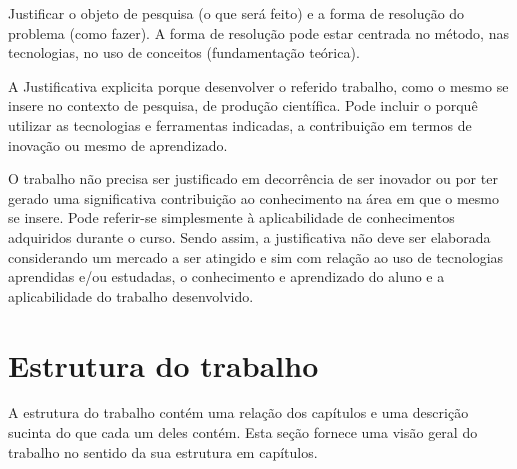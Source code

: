 Justificar o objeto de pesquisa (o que será feito) e a forma de resolução do problema (como fazer). A forma de resolução pode estar centrada no método, nas tecnologias, no uso de conceitos (fundamentação teórica).

A Justificativa explicita porque desenvolver o referido trabalho, como o mesmo se insere no contexto de pesquisa, de produção científica. Pode incluir o porquê utilizar as tecnologias e ferramentas indicadas, a contribuição em termos de inovação ou mesmo de aprendizado.

O trabalho não precisa ser justificado em decorrência de ser inovador ou por ter gerado uma significativa contribuição ao conhecimento na área em que o mesmo se insere. Pode referir-se simplesmente à aplicabilidade de conhecimentos adquiridos durante o curso. Sendo assim, a justificativa não deve ser elaborada considerando um mercado a ser atingido e sim com relação ao uso de tecnologias aprendidas e/ou estudadas, o conhecimento e aprendizado do aluno e a aplicabilidade do trabalho desenvolvido.

\section{Estrutura do trabalho}\label{sec:estruturaTrabalho}

A estrutura do trabalho contém uma relação dos capítulos e uma descrição sucinta do que cada um deles contém. Esta seção fornece uma visão geral do trabalho no sentido da sua estrutura em capítulos.